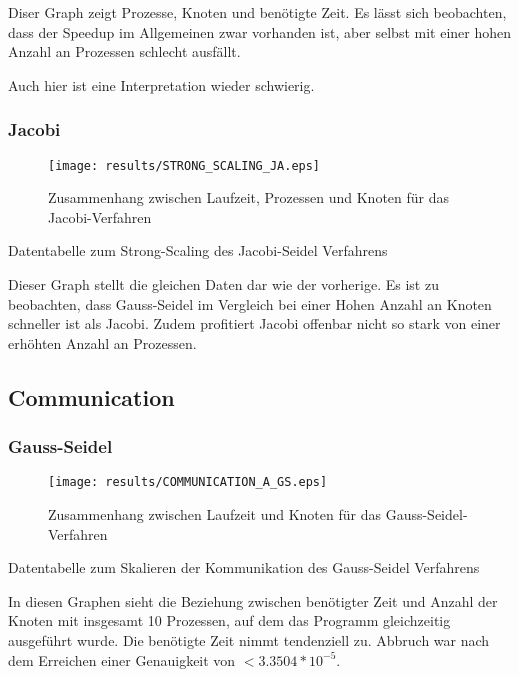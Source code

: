 \documentclass[a4paper,12pt]{scrartcl}
\begin{document}
Diser Graph zeigt Prozesse, Knoten und benötigte Zeit. Es lässt sich
beobachten, dass der Speedup im Allgemeinen zwar vorhanden ist, aber selbst
mit einer hohen Anzahl an Prozessen schlecht ausfällt.

Auch hier ist eine Interpretation wieder schwierig.

\subsubsection{Jacobi}
\begin{figure}[hr!]
\texttt{[image: results/STRONG\_SCALING\_JA.eps]}
 \caption{Zusammenhang zwischen Laufzeit, Prozessen und Knoten für das Jacobi-Verfahren}
\end{figure}
\begin{table}[hl!]

\caption{Datentabelle zum Strong-Scaling des Jacobi-Seidel Verfahrens}
\end{table}

Dieser Graph stellt die gleichen Daten dar wie der vorherige. Es ist zu
beobachten, dass Gauss-Seidel im Vergleich bei einer Hohen Anzahl an Knoten schneller ist als Jacobi.
Zudem profitiert Jacobi offenbar nicht so stark von einer erhöhten Anzahl an Prozessen.
\FloatBarrier
\subsection{Communication}
\subsubsection{Gauss-Seidel}
\begin{figure}[hr!]
\texttt{[image: results/COMMUNICATION\_A\_GS.eps]}
 \caption{Zusammenhang zwischen Laufzeit und Knoten für das Gauss-Seidel-Verfahren}
\end{figure}
\begin{table}[hl!]

\caption{Datentabelle zum Skalieren der Kommunikation des Gauss-Seidel Verfahrens}
\end{table}

In diesen Graphen sieht die Beziehung zwischen benötigter Zeit
und Anzahl der Knoten mit insgesamt 10 Prozessen, auf dem das Programm
gleichzeitig ausgeführt wurde. Die benötigte Zeit nimmt tendenziell zu.
Abbruch war nach dem Erreichen einer Genauigkeit von $<3.3504*10^{-5}$.
\end{document}

